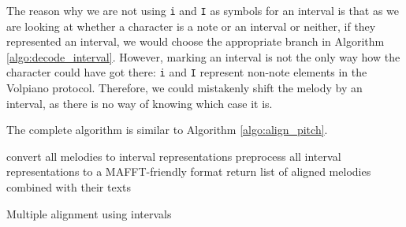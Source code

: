The reason why we are not using \verb|i| and \verb|I| as symbols for an interval is that as we are looking at whether a character is a note or an interval or neither, 
if they represented an interval, we would choose the appropriate branch in Algorithm \ref{algo:decode_interval}. However, marking an interval is not the only way how
the character could have got there: \verb|i| and \verb|I| represent non-note elements in the Volpiano protocol. Therefore, we could mistakenly shift the melody by an interval,
as there is no way of knowing which case it is.

The complete algorithm is similar to Algorithm \ref{algo:align_pitch}.\newline

\begin{algorithm}[H]
    \BlankLine
    convert all melodies to interval representations\;
    preprocess all interval representations to a MAFFT-friendly format\;
    return list of aligned melodies combined with their texts\;
    \caption{Multiple alignment using intervals}
    \label{algo:align_intervals}
\end{algorithm}
